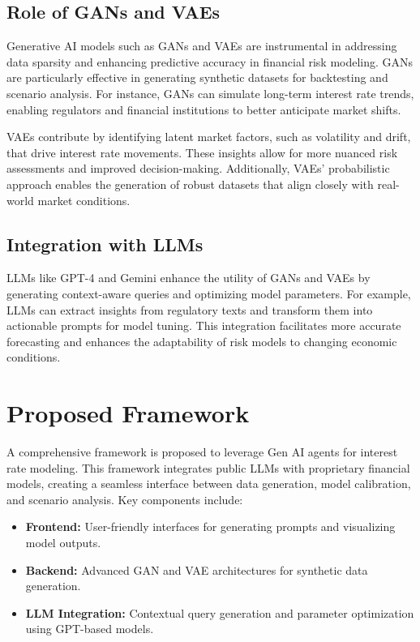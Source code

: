 \documentclass[a4paper,headinclude=on,footinclude=on,12pt,oneside]{scrbook}
\begin{document}
\subsection{Role of GANs and VAEs}

Generative AI models such as GANs and VAEs are instrumental in addressing data sparsity and enhancing predictive accuracy in financial risk modeling. GANs are particularly effective in generating synthetic datasets for backtesting and scenario analysis. For instance, GANs can simulate long-term interest rate trends, enabling regulators and financial institutions to better anticipate market shifts.

VAEs contribute by identifying latent market factors, such as volatility and drift, that drive interest rate movements. These insights allow for more nuanced risk assessments and improved decision-making. Additionally, VAEs’ probabilistic approach enables the generation of robust datasets that align closely with real-world market conditions.

\subsection{Integration with LLMs}

LLMs like GPT-4 and Gemini enhance the utility of GANs and VAEs by generating context-aware queries and optimizing model parameters. For example, LLMs can extract insights from regulatory texts and transform them into actionable prompts for model tuning. This integration facilitates more accurate forecasting and enhances the adaptability of risk models to changing economic conditions.

\section{Proposed Framework}

A comprehensive framework is proposed to leverage Gen AI agents for interest rate modeling. This framework integrates public LLMs with proprietary financial models, creating a seamless interface between data generation, model calibration, and scenario analysis. Key components include:

\begin{itemize}
	\item \textbf{Frontend:} User-friendly interfaces for generating prompts and visualizing model outputs.
	\item \textbf{Backend:} Advanced GAN and VAE architectures for synthetic data generation.
	\item \textbf{LLM Integration:} Contextual query generation and parameter optimization using GPT-based models.
\end{itemize}
\end{document}
